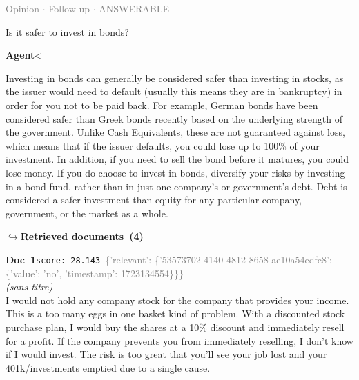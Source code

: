 \documentclass[a4paper,11pt]{article}
\begin{document}
\vspace{0.5em}
\hfill{\tiny\textcolor{gray}{Opinion $\cdot$ Follow-up $\cdot$ ANSWERABLE}}
\begin{userbubble}
Is it safer to invest in bonds?
\end{userbubble}
\noindent\hfill{\small\textcolor{agentcolor}{\textbf{Agent\enspace$\triangleleft$}}}
\begin{agentbubble}
Investing in bonds can generally be considered safer than investing in stocks, as the issuer would need to default (usually this means they are in bankruptcy) in order for you not to be paid back. For example, German bonds have been considered safer than Greek bonds recently based on the underlying strength of the government. Unlike Cash Equivalents, these are not guaranteed against loss, which means that if the issuer defaults, you could lose up to 100\% of your investment. In addition, if you need to sell the bond before it matures, you could lose money.  If you do choose to invest in bonds, diversify your risks by investing in a bond fund, rather than in just one company's or government's debt. Debt is considered a safer investment than equity for any particular company, government, or the market as a whole. 
\end{agentbubble}
\noindent\hfill{\footnotesize\textcolor{doccolor}{\textbf{$\hookrightarrow$\enspace Retrieved documents~(4)}}}
\begin{docenv}
{\footnotesize\textcolor{doccolor}{\textbf{Doc~1}}}\hfill{\tiny\texttt{score:~28.143}}\ {\tiny\textcolor{gray}{\{'relevant': \{'53573702-4140-4812-8658-ae10a54edfc8': \{'value': 'no', 'timestamp': 1723134554\}\}\}}}\\[3pt]
{\small\textit{(sans titre)}}\\[2pt]
\vspace{2pt}
{\footnotesize 
I would not hold any company stock for the company that provides your income.   This is a too many eggs in one basket kind of problem. With a discounted stock purchase plan, I would buy the shares at a 10\% discount and immediately resell for a profit.   If the company prevents you from immediately reselling, I  don't know if I would invest. The risk is too great that you'll see your job lost and your 401k/investments emptied due to a single cause.}
\end{docenv}
\end{document}
